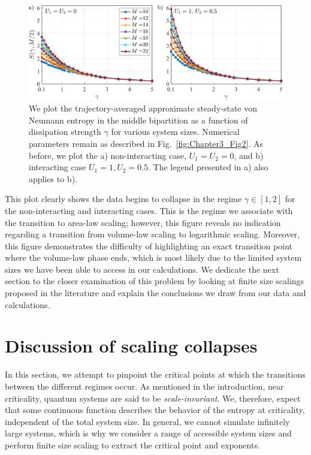 \begin{figure}[ht]
    \centering
    \includegraphics[width=\textwidth]{Chapters/Plots/Chapter4/Chapter3_Fig4.pdf}
    \caption{We plot the trajectory-averaged approximate steady-state von Neumann entropy in the middle bipartition as a function of dissipation strength $\gamma$ for various system sizes. Numerical parameters remain as described in Fig.~\ref{fig:Chapter3_Fig2}. As before, we plot the a) non-interacting case, $U_1 = U_2 = 0$, and b) interacting case $U_1 = 1, U_2 = 0.5$. The legend presented in a) also applies to b).}
    \label{fig:Chapter3_Fig4}
\end{figure}
This plot clearly shows the data begins to collapse in the regime $\gamma \in [1,2]$ for the non-interacting and interacting cases. This is the regime we associate with the transition to area-law scaling; however, this figure reveals no indication regarding a transition from volume-law scaling to logarithmic scaling. Moreover, this figure demonstrates the difficulty of highlighting an exact transition point where the volume-law phase ends, which is most likely due to the limited system sizes we have been able to access in our calculations. We dedicate the next section to the closer examination of this problem by looking at finite size scalings proposed in the literature \cite{skinner2019} and explain the conclusions we draw from our data and calculations.
 
\section{Discussion of scaling collapses}
\label{subsec:discussion_scaling}

In this section, we attempt to pinpoint the critical points at which the transitions between the different regimes occur. As mentioned in the introduction, near criticality, quantum systems are said to be \textit{scale-invariant}. We, therefore, expect that some continuous function describes the behavior of the entropy at criticality, independent of the total system size. In general, we cannot simulate infinitely large systems, which is why we consider a range of accessible system sizes and perform finite size scaling to extract the critical point and exponents. 

